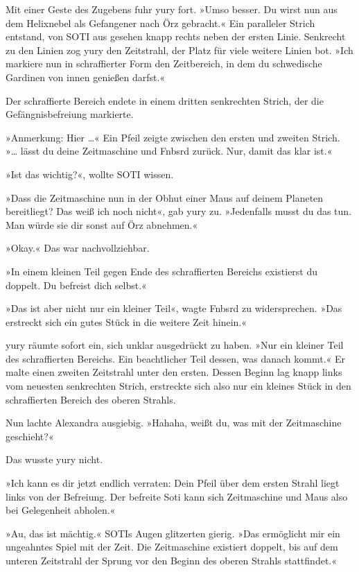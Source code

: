 Mit einer Geste des Zugebens fuhr yury fort. »Umso besser. Du wirst nun aus dem Helixnebel als Gefangener nach Örz gebracht.« Ein paralleler Strich entstand, von SOTI aus gesehen knapp rechts neben der ersten Linie. Senkrecht zu den Linien zog yury den Zeitstrahl, der Platz für viele weitere Linien bot. »Ich markiere nun in schraffierter Form den Zeitbereich, in dem du schwedische Gardinen von innen genießen darfst.«

Der schraffierte Bereich endete in einem dritten senkrechten Strich, der die Gefängnisbefreiung markierte.

»Anmerkung: Hier …« Ein Pfeil zeigte zwischen den ersten und zweiten Strich. »… lässt du deine Zeitmaschine und Fnbsrd zurück. Nur, damit das klar ist.«

»Ist das wichtig?«, wollte SOTI wissen.

»Dass die Zeitmaschine nun in der Obhut einer Maus auf deinem Planeten bereitliegt? Das weiß ich noch nicht«, gab yury zu. »Jedenfalls musst du das tun. Man würde sie dir sonst auf Örz abnehmen.«

»Okay.« Das war nachvollziehbar.

»In einem kleinen Teil gegen Ende des schraffierten Bereichs existierst du doppelt. Du befreist dich selbst.«

»Das ist aber nicht nur ein kleiner Teil«, wagte Fnbsrd zu widersprechen. »Das erstreckt sich ein gutes Stück in die weitere Zeit hinein.«

yury räumte sofort ein, sich unklar ausgedrückt zu haben. »Nur ein kleiner Teil des schraffierten Bereichs. Ein beachtlicher Teil dessen, was danach kommt.« Er malte einen zweiten Zeitstrahl unter den ersten. Dessen Beginn lag knapp links vom neuesten senkrechten Strich, erstreckte sich also nur ein kleines Stück in den schraffierten Bereich des oberen Strahls.

Nun lachte Alexandra ausgiebig. »Hahaha, weißt du, was mit der Zeitmaschine geschieht?«

Das wusste yury nicht.

»Ich kann es dir jetzt endlich verraten: Dein Pfeil über dem ersten Strahl liegt links von der Befreiung. Der befreite Soti kann sich Zeitmaschine und Maus also bei Gelegenheit abholen.«

»Au, das ist mächtig.« SOTIs Augen glitzerten gierig. »Das ermöglicht mir ein ungeahntes Spiel mit der Zeit. Die Zeitmaschine existiert doppelt, bis auf dem unteren Zeitstrahl der Sprung vor den Beginn des oberen Strahls stattfindet.«

